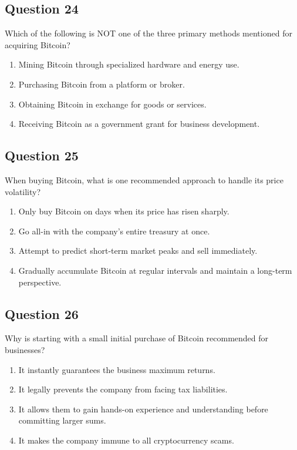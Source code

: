 \documentclass[12pt,a4paper]{article}
\begin{document}
\bigskip


\subsection*{Question 24}
Which of the following is NOT one of the three primary methods mentioned for acquiring Bitcoin?

\begin{enumerate}[label=\Alph*., leftmargin=*]
\item Mining Bitcoin through specialized hardware and energy use.
\item Purchasing Bitcoin from a platform or broker.
\item Obtaining Bitcoin in exchange for goods or services.
\item Receiving Bitcoin as a government grant for business development.
\end{enumerate}

\bigskip


\subsection*{Question 25}
When buying Bitcoin, what is one recommended approach to handle its price volatility?

\begin{enumerate}[label=\Alph*., leftmargin=*]
\item Only buy Bitcoin on days when its price has risen sharply.
\item Go all-in with the company’s entire treasury at once.
\item Attempt to predict short-term market peaks and sell immediately.
\item Gradually accumulate Bitcoin at regular intervals and maintain a long-term perspective.
\end{enumerate}

\bigskip


\subsection*{Question 26}
Why is starting with a small initial purchase of Bitcoin recommended for businesses?

\begin{enumerate}[label=\Alph*., leftmargin=*]
\item It instantly guarantees the business maximum returns.
\item It legally prevents the company from facing tax liabilities.
\item It allows them to gain hands-on experience and understanding before committing larger sums.
\item It makes the company immune to all cryptocurrency scams.
\end{enumerate}
\end{document}

